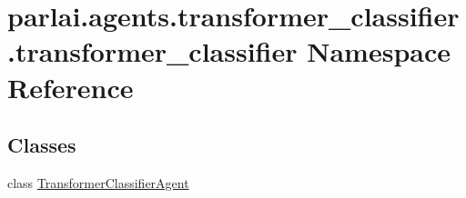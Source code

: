 \hypertarget{namespaceparlai_1_1agents_1_1transformer__classifier_1_1transformer__classifier}{}\section{parlai.\+agents.\+transformer\+\_\+classifier.\+transformer\+\_\+classifier Namespace Reference}
\label{namespaceparlai_1_1agents_1_1transformer__classifier_1_1transformer__classifier}
\subsection*{Classes}
\begin{DoxyCompactItemize}
\item 
class \hyperlink{classparlai_1_1agents_1_1transformer__classifier_1_1transformer__classifier_1_1TransformerClassifierAgent}{Transformer\+Classifier\+Agent}
\end{DoxyCompactItemize}
